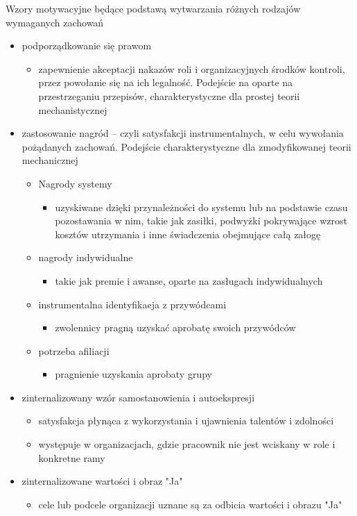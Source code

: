 \documentclass[a4paper,10pt]{report}
\begin{document}
\noindent Wzory motywacyjne będące podstawą wytwarzania różnych rodzajów wymaganych zachowań
\begin{itemize}
	\item podporządkowanie się prawom
	\begin{itemize}
		\item zapewnienie akceptacji nakazów roli i organizacyjnych środków kontroli, przez powołanie się na ich legalność. Podejście na oparte na przestrzeganiu przepisów, charakterystyczne dla prostej teorii mechanistycznej
	\end{itemize}
	\item zastosowanie nagród -- czyli satysfakcji instrumentalnych, w celu wywołania pożądanych zachowań. Podejście charakterystyczne dla zmodyfikowanej teorii mechanicznej
	\begin{itemize}
		\item Nagrody systemy
		\begin{itemize}
			\item uzyskiwane dzięki przynależności do systemu lub na podstawie czasu pozostawania w nim, takie jak zasiłki, podwyżki pokrywające wzrost kosztów utrzymania i inne świadczenia obejmujące całą załogę
		\end{itemize}
		\item nagrody indywidualne
		\begin{itemize}
			\item takie jak premie i awanse, oparte na zasługach indywidualnych
		\end{itemize}
		\item instrumentalna identyfikacja z przywódcami
		\begin{itemize}
			\item zwolennicy pragną uzyskać aprobatę swoich przywódców
		\end{itemize}
		\item potrzeba afiliacji
		\begin{itemize}
			\item pragnienie uzyskania aprobaty grupy
		\end{itemize}
	\end{itemize}
	\item zinternalizowany wzór samostanowienia i autoekspresji
	\begin{itemize}
		\item satysfakcja płynąca z wykorzystania i ujawnienia talentów i zdolności
		\item występuje w organizacjach, gdzie pracownik nie jest wciskany w role i konkretne ramy
	\end{itemize}
	\item zinternalizowane wartości i obraz "Ja"
	\begin{itemize}
		\item cele lub podcele organizacji uznane są za odbicia wartości i obrazu "Ja"
	\end{itemize}
\end{itemize}
\end{document}
